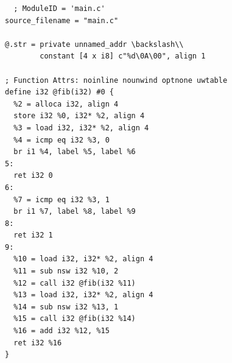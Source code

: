 \documentclass[dvipdfmx]{jarticle}
\begin{document}
\begin{Verbatim}
  ; ModuleID = 'main.c'
source_filename = "main.c"

@.str = private unnamed_addr \backslash\\
        constant [4 x i8] c"%d\0A\00", align 1

; Function Attrs: noinline nounwind optnone uwtable
define i32 @fib(i32) #0 {
  %2 = alloca i32, align 4
  store i32 %0, i32* %2, align 4
  %3 = load i32, i32* %2, align 4
  %4 = icmp eq i32 %3, 0
  br i1 %4, label %5, label %6
5:
  ret i32 0
6:
  %7 = icmp eq i32 %3, 1
  br i1 %7, label %8, label %9
8:
  ret i32 1
9:
  %10 = load i32, i32* %2, align 4
  %11 = sub nsw i32 %10, 2
  %12 = call i32 @fib(i32 %11)
  %13 = load i32, i32* %2, align 4
  %14 = sub nsw i32 %13, 1
  %15 = call i32 @fib(i32 %14)
  %16 = add i32 %12, %15
  ret i32 %16
}
\end{Verbatim}
\end{document}
